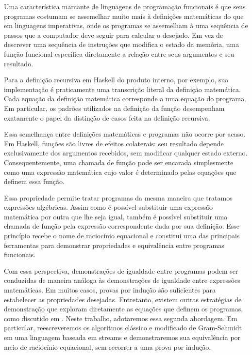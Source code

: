 
Uma característica marcante de linguagens de programação funcionais é que seus programas costumam se assemelhar muito mais à definições matemáticas do que em linguagens imperativas, onde os programas se assemelham à uma sequência de passos que a computador deve seguir para calcular o desejado. Em vez de descrever uma sequência de instruções que modifica o estado da memória, uma função funcional especifica diretamente a relação entre seus argumentos e seu resultado.

Para a definição recursiva em Haskell do produto interno, por exemplo, sua implementação é praticamente uma transcrição literal da definição matemática. Cada equação da definição matemática corresponde a uma equação do programa. Em particular, os padrões utilizados na definição da função desempenham exatamente o papel da distinção de casos feita na definição recursiva.

Essa semelhança entre definições matemáticas e programas não ocorre por acaso. Em Haskell, funções são livres de efeitos colaterais: seu resultado depende exclusivamente dos argumentos recebidos, sem modificar qualquer estado externo. Consequentemente, uma chamada de função pode ser encarada simplesmente como uma expressão matemática cujo valor é determinado pelas equações que definem essa função.

Essa propriedade permite tratar programas da mesma maneira que tratamos expressões algébricas. Assim como é possível substituir uma expressão matemática por outra que lhe seja igual, também é possível substituir uma chamada de função pela expressão correspondente dada por sua definição. Esse princípio recebe o nome de raciocínio equacional e constitui uma das principais ferramentas para demonstrar propriedades e equivalência entre programas funcionais.

Com essa perspectiva, demonstrações de igualdade entre programas podem ser conduzidas de maneira análoga às demonstrações de igualdade entre expressões matemáticas. Em muitos casos, provas por indução são suficientes para estabelecer as propriedades desejadas. Entretanto, existem outras estratégias de demonstração que exploram diretamente as equações que definem os programas, como discutido em \cite{Gibbons2005}. Neste trabalho, adotaremos essa segunda abordagem. Em particular, reescreveremos os algoritmos clássico e modificado de Gram-Schmidt em uma linguagem baseada em streams e demonstraremos sua equivalência por meio de raciocínio equacional, sem recorrer a uma prova por indução.
